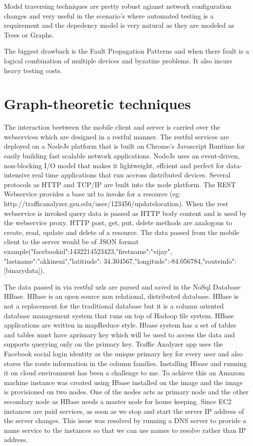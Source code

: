 \documentclass[10pt]{sigplan-proc-varsize}
\begin{document}
Model traversing techniques are pretty robust agianst network configuration changes and very useful in the scenario's where automated testing is a requirement and the depedency model is very natural as they are modeled as Trees or Graphs. 

The biggest drawback is the Fault Propagation Patterns and when there  fault is a logical combination of multiple devices and byzatine problems. It also incurs heavy testing costs. 

\section{Graph-theoretic techniques}

 The interaction beetween the mobile client and server is carried over the webservices which are designed in a restful manner.  The restful services are deployed on a NodeJs platform that is built on Chrome's Javascript Runtime for easily building fast scalable network applications. NodeJs uses an event-driven, non-blocking I/O model that makes it lightweight, effcient and perfect for data-intensive real time applications that run accross distributed devices. Several protocols as HTTP and TCP/IP are built into the node platform. The REST Webservice provides a base url to invoke for a resource (eg: http://trafficanalyzer.gsu.edu/user/123456/updatelocation). When the rest webservice is invoked query data is passed as HTTP body content and is used by the webservice proxy. HTTP post, get, put, delete methods are analogous to create, read, update and delete of a resource. The data passed from the mobile client to the server would be of JSON format example({"facebookid":1432214523423,"firstname":"vijay",
"lastname":"akkineni","latitiude": 34.304567,"longitude":-84.056784,"routeinfo":[binarydata]}).
 
The data passed in via restful urls are parsed and saved in the NoSql Database HBase.  HBase is an open source non relational, distributed database. HBase is not a replacement for the traditional database but it is a column oriented database management system that runs on top of Hadoop file system. HBase applications are written in mapReduce style. Hbase system has a set of tables and tables must have aprimary key which will be used to access the data and supports querying only on the primary key.  Traffic Analyzer app uses the Facebook social login identity as the unique primary key for every user and also stores the route information in the column families. Installing Hbase and running it on cloud environment has been a challenge to me. To achieve this an Amazom machine instance was created using Hbase installed on the image and the image is provisioned on two nodes. One of the nodes acts as primary node and the other secondary node as HBase needs a master node for house keeping. Since EC2 instances are paid services, as soon as we stop and start the server IP address of the server changes. This issue was resolved by running a DNS server to provide a name service to the instances so that we can use names to resolve rather than IP address. 
\end{document}
